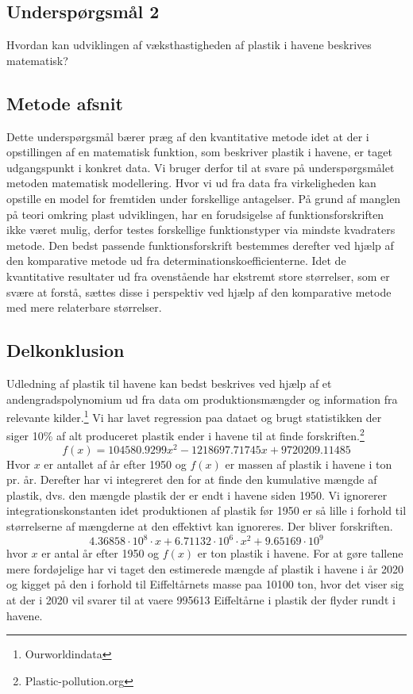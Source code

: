\documentclass[12pt]{article}
\begin{document}
\subsection*{Underspørgsmål 2}

Hvordan kan udviklingen af væksthastigheden af plastik i havene beskrives matematisk?

\subsection*{Metode afsnit}

Dette underspørgsmål bærer præg af den kvantitative metode idet at der i opstillingen af en matematisk funktion, som beskriver plastik i havene, er taget udgangspunkt i konkret data. Vi bruger derfor til at svare på underspørgsmålet metoden matematisk modellering. Hvor vi ud fra data fra virkeligheden kan opstille en model for fremtiden under forskellige antagelser. På grund af manglen på teori omkring plast udviklingen, har en forudsigelse af funktionsforskriften ikke været mulig, derfor testes forskellige funktionstyper via mindste kvadraters metode. Den bedst passende funktionsforskrift bestemmes derefter ved hjælp af den komparative metode ud fra determinationskoefficienterne.
Idet de kvantitative resultater ud fra ovenstående har ekstremt store størrelser, som er svære at forstå, sættes disse i perspektiv ved hjælp af den komparative metode med mere relaterbare størrelser.


\subsection*{Delkonklusion}

Udledning af plastik til havene kan bedst beskrives ved hjælp af et andengradspolynomium ud fra data om produktionsmængder og information fra relevante kilder.\footnote{Ourworldindata} Vi har lavet regression paa dataet og brugt statistikken der siger 10\% af alt produceret plastik ender i havene til at finde forskriften.\footnote{Plastic-pollution.org}
$$f(x) = 104580.9299x^2 -1218697.71745x+9720209.11485$$
Hvor $x$ er antallet af  år efter 1950 og $f(x)$ er massen af plastik i havene i ton pr. år. Derefter har vi integreret den for at finde den kumulative mængde af plastik, dvs. den mængde plastik der er endt i havene siden 1950. Vi ignorerer integrationskonstanten idet produktionen af plastik før 1950 er så lille i forhold til størrelserne af mængderne at den effektivt kan ignoreres. Der bliver forskriften.
$$4.36858\cdot 10^8\cdot x+6.71132\cdot 10^6\cdot x^2+9.65169\cdot10^9$$
hvor $x$ er antal år efter 1950 og $f(x)$ er ton plastik i havene.
For at gøre tallene mere fordøjelige har vi taget den estimerede mængde af plastik i havene i år 2020 og kigget på den i forhold til Eiffeltårnets masse paa 10100 ton, hvor det viser sig at der i 2020 vil svarer til at vaere 995613 Eiffeltårne i plastik der flyder rundt i havene.
\end{document}
